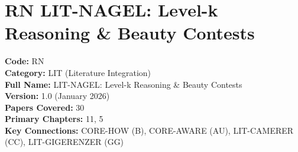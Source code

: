 %
%

\chapter{RN LIT-NAGEL: Level-k Reasoning \& Beauty Contests}
\label{app:lit-nagel}

\begin{tcolorbox}[colback=blue!5!white, colframe=blue!75!black, title=Appendix Metadata]
\textbf{Code:} RN \\
\textbf{Category:} LIT (Literature Integration) \\
\textbf{Full Name:} LIT-NAGEL: Level-k Reasoning \& Beauty Contests \\
\textbf{Version:} 1.0 (January 2026) \\
\textbf{Papers Covered:} 30 \\
\textbf{Primary Chapters:} 11, 5 \\
\textbf{Key Connections:} CORE-HOW (B), CORE-AWARE (AU), LIT-CAMERER (CC), LIT-GIGERENZER (GG)
\end{tcolorbox}

